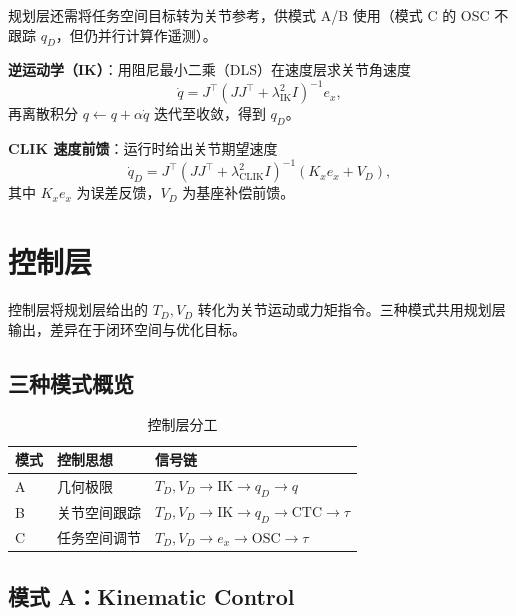 \documentclass[UTF8, a4paper, 12pt]{ctexart}
\begin{document}
规划层还需将任务空间目标转为关节参考，供模式 A/B 使用（模式 C 的 OSC 不跟踪 $q_D$，但仍并行计算作遥测）。

\textbf{逆运动学（IK）}：用阻尼最小二乘（DLS）在速度层求关节角速度
\begin{equation}
    \dot{q} = J^\top (JJ^\top + \lambda_{\mathrm{IK}}^2 I)^{-1} e_x,
\end{equation}
再离散积分 $q\leftarrow q+\alpha\dot{q}$ 迭代至收敛，得到 $q_D$。

\textbf{CLIK 速度前馈}：运行时给出关节期望速度
\begin{equation}
    \dot{q}_D = J^\top (JJ^\top + \lambda_{\mathrm{CLIK}}^2 I)^{-1}(K_x e_x + V_D),
\end{equation}
其中 $K_x e_x$ 为误差反馈，$V_D$ 为基座补偿前馈。

\section{控制层}

控制层将规划层给出的 $T_D,V_D$ 转化为关节运动或力矩指令。三种模式共用规划层输出，差异在于闭环空间与优化目标。

\subsection{三种模式概览}

\begin{table}[H]
  \centering
  \caption{控制层分工}
  \renewcommand{\arraystretch}{1.2}
  \begin{tabular}{@{} l l l @{}}
    \toprule
    模式 & 控制思想 & 信号链 \\
    \midrule
    A & 几何极限 & $T_D,V_D \rightarrow \mathrm{IK} \rightarrow q_D \rightarrow q$ \\
    B & 关节空间跟踪 & $T_D,V_D \rightarrow \mathrm{IK} \rightarrow q_D \rightarrow \mathrm{CTC} \rightarrow \tau$ \\
    C & 任务空间调节 & $T_D,V_D \rightarrow e_x \rightarrow \mathrm{OSC} \rightarrow \tau$ \\
    \bottomrule
  \end{tabular}
\end{table}

\subsection{模式 A：Kinematic Control}
\end{document}
